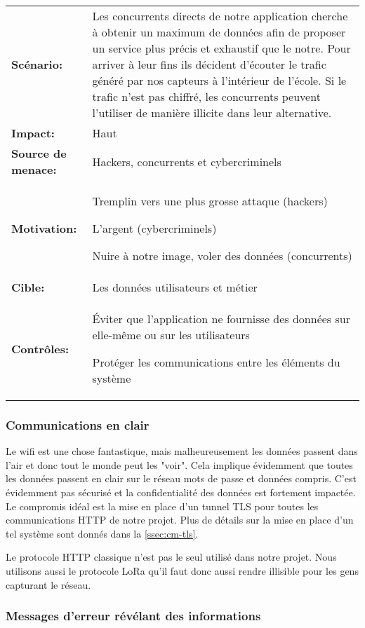\renewcommand{\arraystretch}{1.6}
\begin{tabular}{@{}p{4cm}p{12cm}}
\textbf{Scénario:} &  Les concurrents directs de notre application cherche à obtenir un maximum de données afin de proposer un service plus précis et exhaustif que le notre. Pour arriver à leur fins ils décident d'écouter le trafic généré par nos capteurs à l'intérieur de l'école. Si le trafic n'est pas chiffré, les concurrents peuvent l'utiliser de manière illicite dans leur alternative.\\
\textbf{Impact:} & Haut \\
\textbf{Source de menace: } & Hackers, concurrents et cybercriminels \\
\textbf{Motivation:} & Tremplin vers une plus grosse attaque (hackers)

L'argent (cybercriminels)

Nuire à notre image, voler des données (concurrents)\\
\textbf{Cible:} & Les données utilisateurs et métier \\
\textbf{Contrôles:} & Éviter que l'application ne fournisse des données sur elle-même ou sur les utilisateurs

Protéger les communications entre les éléments du système
\end{tabular}
\renewcommand{\arraystretch}{1}

\subsubsection{Communications en clair}

Le wifi est une chose fantastique, mais malheureusement les données passent dans l'air et donc tout le monde peut les "voir". Cela implique évidemment que toutes les données passent en clair sur le réseau mots de passe et données compris. C'est évidemment pas sécurisé et la confidentialité des données est fortement impactée. Le compromis idéal est la mise en place d'un tunnel TLS pour toutes les communications HTTP de notre projet. Plus de détails sur la mise en place d'un tel système sont donnés dans la \autoref{ssec:cm-tls}.

Le protocole HTTP classique n'est pas le seul utilisé dans notre projet. Nous utilisons aussi le protocole LoRa qu'il faut donc aussi rendre illisible pour les gens capturant le réseau.

\subsubsection{Messages d'erreur révélant des informations}

